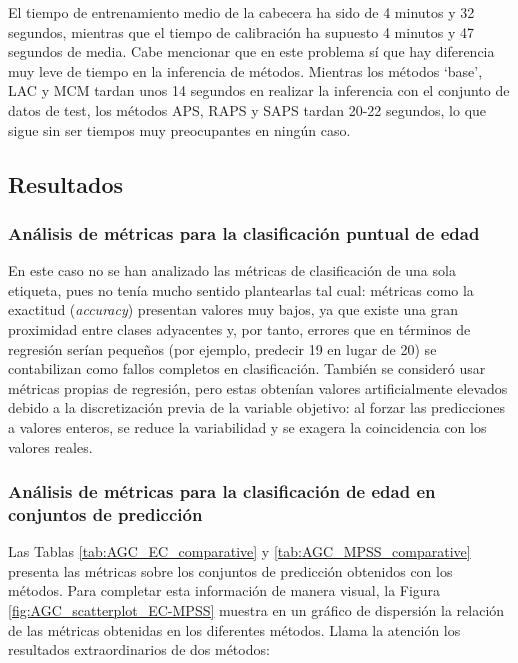 El tiempo de entrenamiento medio de la cabecera ha sido de 4 minutos y 32 segundos, mientras que el tiempo de calibración ha supuesto 4 minutos y 47 segundos de media. Cabe mencionar que en este problema sí que hay diferencia muy leve de tiempo en la inferencia de métodos. Mientras los métodos `base', LAC y MCM tardan unos 14 segundos en realizar la inferencia con el conjunto de datos de test, los métodos APS, RAPS y SAPS tardan 20-22 segundos, lo que sigue sin ser tiempos muy preocupantes en ningún caso. 


\subsection{Resultados}

\subsubsection{Análisis de métricas para la clasificación puntual de edad}

En este caso no se han analizado las métricas de clasificación de una sola etiqueta, pues no tenía mucho sentido plantearlas tal cual: métricas como la exactitud (\textit{accuracy}) presentan valores muy bajos, ya que existe una gran proximidad entre clases adyacentes y, por tanto, errores que en términos de regresión serían pequeños (por ejemplo, predecir 19 en lugar de 20) se contabilizan como fallos completos en clasificación. También se consideró usar métricas propias de regresión, pero estas obtenían valores artificialmente elevados debido a la discretización previa de la variable objetivo: al forzar las predicciones a valores enteros, se reduce la variabilidad y se exagera la coincidencia con los valores reales.

\subsubsection{Análisis de métricas para la clasificación de edad en conjuntos de predicción}

Las Tablas \ref{tab:AGC_EC_comparative} y \ref{tab:AGC_MPSS_comparative} presenta las métricas sobre los conjuntos de predicción obtenidos con los métodos. Para completar esta información de manera visual, la Figura \ref{fig:AGC_scatterplot_EC-MPSS} muestra en un gráfico de dispersión la relación de las métricas obtenidas en los diferentes métodos. Llama la atención los resultados extraordinarios de dos métodos:

